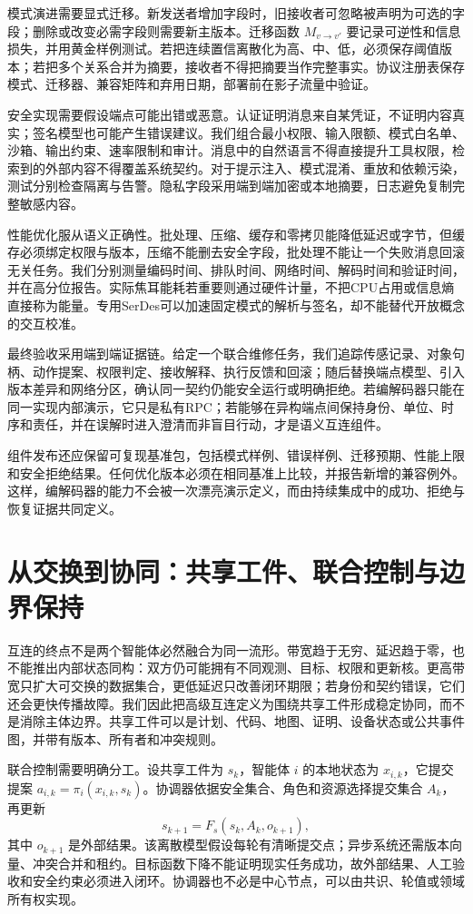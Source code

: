 模式演进需要显式迁移。新发送者增加字段时，旧接收者可忽略被声明为可选的字段；删除或改变必需字段则需要新主版本。迁移函数 $M_{v\to v'}$ 要记录可逆性和信息损失，并用黄金样例测试。若把连续置信离散化为高、中、低，必须保存阈值版本；若把多个关系合并为摘要，接收者不得把摘要当作完整事实。协议注册表保存模式、迁移器、兼容矩阵和弃用日期，部署前在影子流量中验证。

安全实现需要假设端点可能出错或恶意。认证证明消息来自某凭证，不证明内容真实；签名模型也可能产生错误建议。我们组合最小权限、输入限额、模式白名单、沙箱、输出约束、速率限制和审计。消息中的自然语言不得直接提升工具权限，检索到的外部内容不得覆盖系统契约。对于提示注入、模式混淆、重放和依赖污染，测试分别检查隔离与告警。隐私字段采用端到端加密或本地摘要，日志避免复制完整敏感内容。

性能优化服从语义正确性。批处理、压缩、缓存和零拷贝能降低延迟或字节，但缓存必须绑定权限与版本，压缩不能删去安全字段，批处理不能让一个失败消息回滚无关任务。我们分别测量编码时间、排队时间、网络时间、解码时间和验证时间，并在高分位报告。实际焦耳能耗若重要则通过硬件计量，不把CPU占用或信息熵直接称为能量。专用SerDes可以加速固定模式的解析与签名，却不能替代开放概念的交互校准。

最终验收采用端到端证据链。给定一个联合维修任务，我们追踪传感记录、对象句柄、动作提案、权限判定、接收解释、执行反馈和回滚；随后替换端点模型、引入版本差异和网络分区，确认同一契约仍能安全运行或明确拒绝。若编解码器只能在同一实现内部演示，它只是私有RPC；若能够在异构端点间保持身份、单位、时序和责任，并在误解时进入澄清而非盲目行动，才是语义互连组件。

组件发布还应保留可复现基准包，包括模式样例、错误样例、迁移预期、性能上限和安全拒绝结果。任何优化版本必须在相同基准上比较，并报告新增的兼容例外。这样，编解码器的能力不会被一次漂亮演示定义，而由持续集成中的成功、拒绝与恢复证据共同定义。

\section{从交换到协同：共享工件、联合控制与边界保持}
\label{sec:fusion_endpoint}

互连的终点不是两个智能体必然融合为同一流形。带宽趋于无穷、延迟趋于零，也不能推出内部状态同构：双方仍可能拥有不同观测、目标、权限和更新核。更高带宽只扩大可交换的数据集合，更低延迟只改善闭环期限；若身份和契约错误，它们还会更快传播故障。我们因此把高级互连定义为围绕共享工件形成稳定协同，而不是消除主体边界。共享工件可以是计划、代码、地图、证明、设备状态或公共事件图，并带有版本、所有者和冲突规则。

联合控制需要明确分工。设共享工件为 $s_k$，智能体 $i$ 的本地状态为 $x_{i,k}$，它提交提案 $a_{i,k}=\pi_i(x_{i,k},s_k)$。协调器依据安全集合、角色和资源选择提交集合 $A_k$，再更新
\begin{equation}
 s_{k+1}=F_s(s_k,A_k,o_{k+1}),
\end{equation}
其中 $o_{k+1}$ 是外部结果。该离散模型假设每轮有清晰提交点；异步系统还需版本向量、冲突合并和租约。目标函数下降不能证明现实任务成功，故外部结果、人工验收和安全约束必须进入闭环。协调器也不必是中心节点，可以由共识、轮值或领域所有权实现。

